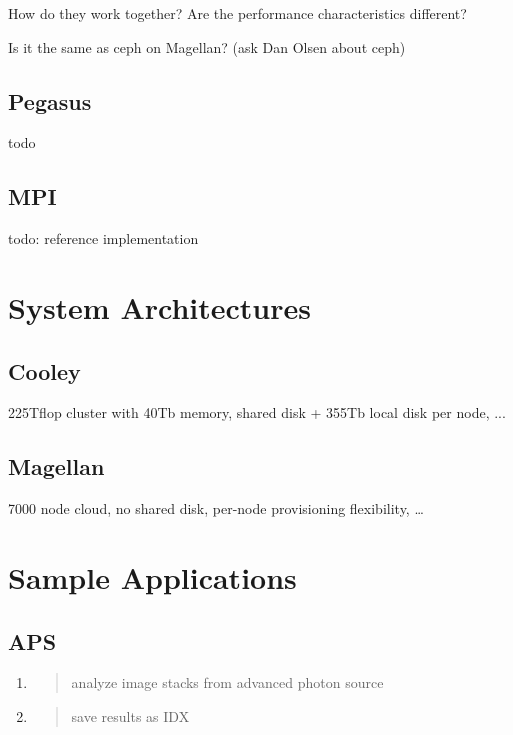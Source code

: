 \documentclass{sig-alternate}
\begin{document}
How do they work together? Are the performance characteristics
different?

Is it the same as ceph on Magellan? (ask Dan Olsen about ceph)

\subsection{Pegasus}\label{pegasus}

todo

\subsection{MPI}\label{mpi}

todo: reference implementation

\section{System Architectures}\label{system-architectures}

\subsection{Cooley}\label{cooley}

225Tflop cluster with 40Tb memory, shared disk + 355Tb local disk per
node, ...

\subsection{Magellan}\label{magellan}

7000 node cloud, no shared disk, per-node provisioning flexibility,
\ldots{}

\section{Sample Applications}\label{sample-applications}

\subsection{APS}\label{aps}

\begin{enumerate}
\def\labelenumi{\arabic{enumi}.}
\item
  \begin{quote}
  analyze image stacks from advanced photon source
  \end{quote}
\item
  \begin{quote}
  save results as IDX
  \end{quote}
\end{enumerate}
\end{document}
